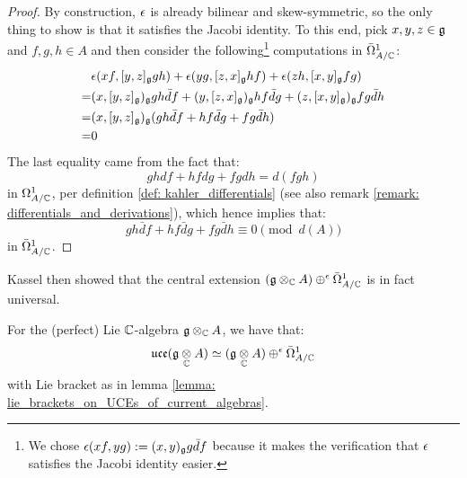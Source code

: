             \begin{proof}
                By construction, $\epsilon$ is already bilinear and skew-symmetric, so the only thing to show is that it satisfies the Jacobi identity. To this end, pick $x, y, z \in \mathfrak{g}$ and $f, g, h \in A$ and then consider the following\footnote{We chose $\epsilon(xf, yg) := (x, y)_{\mathfrak{g}} g \bar{d}f$ because it makes the verification that $\epsilon$ satisfies the Jacobi identity easier.} computations in $\bar{\Omega}^1_{A/\mathbb{C}}$:
                    $$
                        \begin{aligned}
                            & \epsilon(xf, [y, z]_{\mathfrak{g}} gh) + \epsilon(yg, [z, x]_{\mathfrak{g}} hf) + \epsilon(zh, [x, y]_{\mathfrak{g}} fg)
                            \\
                            = & (x, [y, z]_{\mathfrak{g}})_{\mathfrak{g}} gh \bar{d}f + (y, [z, x]_{\mathfrak{g}})_{\mathfrak{g}} hf \bar{d}g + (z, [x, y]_{\mathfrak{g}})_{\mathfrak{g}} fg \bar{d}h
                            \\
                            = & (x, [y, z]_{\mathfrak{g}})_{\mathfrak{g}} ( gh \bar{d}f + hf \bar{d}g + fg\bar{d}h )
                            \\
                            = & 0
                        \end{aligned}
                    $$
                The last equality came from the fact that:
                    $$gh df + hf dg + fg dh = d(fgh)$$
                in $\Omega^1_{A/\mathbb{C}}$, per definition \ref{def: kahler_differentials} (see also remark \ref{remark: differentials_and_derivations}), which hence implies that:
                    $$gh \bar{d}f + hf \bar{d}g + fg \bar{d}h \equiv 0 \pmod{d(A)}$$
                in $\bar{\Omega}^1_{A/\mathbb{C}}$.
            \end{proof}
        Kassel then showed that the central extension $(\g \tensor_{\bbC} A) \oplus^{\e} \bar{\Omega}^1_{A/\bbC}$ is in fact universal.
        \begin{theorem} \label{theorem: kassel_realisation}
            \cite[Corollary 3.5]{kassel_universal_central_extensions_of_lie_algebras} For the (perfect) Lie $\mathbb{C}$-algebra $\g \tensor_{\bbC} A$, we have that:
                $$\uce(\g \tensor_{\bbC} A) \cong (\g \tensor_{\bbC} A) \oplus^{\e} \bar{\Omega}^1_{A/\bbC}$$
            with Lie bracket as in lemma \ref{lemma: lie_brackets_on_UCEs_of_current_algebras}.
        \end{theorem}